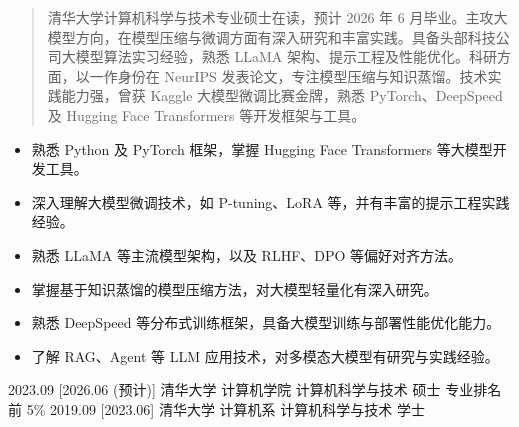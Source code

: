 \documentclass[zh]{resume}
\begin{document}
\makeheader

\begin{abstract}
清华大学计算机科学与技术专业硕士在读，预计 2026 年 6 月毕业。主攻大模型方向，在模型压缩与微调方面有深入研究和丰富实践。具备头部科技公司大模型算法实习经验，熟悉 LLaMA 架构、提示工程及性能优化。科研方面，以一作身份在 NeurIPS 发表论文，专注模型压缩与知识蒸馏。技术实践能力强，曾获 Kaggle 大模型微调比赛金牌，熟悉 PyTorch、DeepSpeed 及 Hugging Face Transformers 等开发框架与工具。
\end{abstract}

\begin{itemize}
    \item 熟悉 Python 及 PyTorch 框架，掌握 Hugging Face Transformers 等大模型开发工具。
    \item 深入理解大模型微调技术，如 P-tuning、LoRA 等，并有丰富的提示工程实践经验。
    \item 熟悉 LLaMA 等主流模型架构，以及 RLHF、DPO 等偏好对齐方法。
    \item 掌握基于知识蒸馏的模型压缩方法，对大模型轻量化有深入研究。
    \item 熟悉 DeepSpeed 等分布式训练框架，具备大模型训练与部署性能优化能力。
    \item 了解 RAG、Agent 等 LLM 应用技术，对多模态大模型有研究与实践经验。
\end{itemize}

\begin{educations}
  \education%
    {2023.09}%
    [2026.06 (预计)]%
    {清华大学}%
    {计算机学院}%
    {计算机科学与技术}%
    {硕士 \quad 专业排名前 5\%}
  \separator{0.5ex}
  \education%
    {2019.09}%
    [2023.06]%
    {清华大学}%
    {计算机系}%
    {计算机科学与技术}%
    {学士}
\end{educations}
\end{document}
